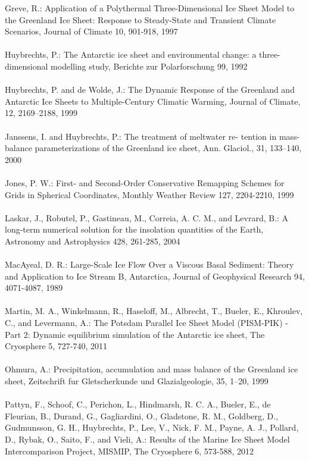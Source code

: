 \documentclass{article}
\begin{document}
Greve, R.: Application of a Polythermal Three-Dimensional Ice Sheet Model to the Greenland Ice Sheet: Response to Steady-State and Transient Climate Scenarios, Journal of Climate 10, 901-918, 1997\\
\\
Huybrechts, P.: The Antarctic ice sheet and environmental change: a three-dimensional modelling study, Berichte zur Polarforschung 99, 1992\\
\\
Huybrechts, P. and de Wolde, J.: The Dynamic Response of the Greenland and Antarctic Ice Sheets to Multiple-Century Climatic Warming, Journal of Climate, 12, 2169–2188, 1999\\
\\
Janssens, I. and Huybrechts, P.: The treatment of meltwater re- tention in mass-balance parameterizations of the Greenland ice sheet, Ann. Glaciol., 31, 133–140, 2000\\
\\
Jones, P. W.: First- and Second-Order Conservative Remapping Schemes for Grids in Spherical Coordinates, Monthly Weather Review 127, 2204-2210, 1999\\
\\
Laskar, J., Robutel, P., Gastineau, M., Correia, A. C. M., and Levrard, B.: A long-term numerical solution for the insolation quantities of the Earth, Astronomy and Astrophysics 428, 261-285, 2004\\
\\
MacAyeal, D. R.: Large-Scale Ice Flow Over a Viscous Basal Sediment: Theory and Application to Ice Stream B, Antarctica, Journal of Geophysical Research 94, 4071-4087, 1989\\
\\
Martin, M. A., Winkelmann, R., Haseloff, M., Albrecht, T., Bueler, E., Khroulev, C., and Levermann, A.: The Potsdam Parallel Ice Sheet Model (PISM-PIK) - Part 2: Dynamic equilibrium simulation of the Antarctic ice sheet, The Cryosphere 5, 727-740, 2011\\
\\
Ohmura, A.: Precipitation, accumulation and mass balance of the Greenland ice sheet, Zeitschrift fur Gletscherkunde und Glazialgeologie, 35, 1–20, 1999\\
\\
Pattyn, F., Schoof, C., Perichon, L., Hindmarsh, R. C. A., Bueler, E., de Fleurian, B., Durand, G., Gagliardini, O., Gladstone, R. M., Goldberg, D., Gudmunsson, G. H., Huybrechts, P., Lee, V., Nick, F. M., Payne, A. J., Pollard, D., Rybak, O., Saito, F., and Vieli, A.: Results of the Marine Ice Sheet Model Intercomparison Project, MISMIP, The Cryosphere 6, 573-588, 2012\\
\end{document}
